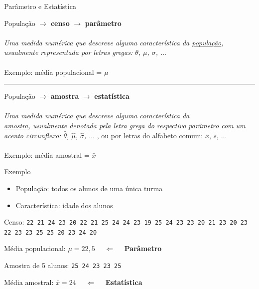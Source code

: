 \documentclass[10pt]{beamer}
\theoremstyle{definition}
\begin{document}
\begin{frame}{Parâmetro e Estatística}
  \begin{center}
    População $\rightarrow$ \textbf{censo} $\rightarrow$
    \textbf{parâmetro} \\~\\
    \textsl{Uma medida numérica que descreve alguma
      característica da \underline{população}, usualmente representada
      por letras gregas: $\theta$, $\mu$, $\sigma$, $\ldots$} \\~\\
    Exemplo: média populacional = $\mu$
  \end{center}
  \vspace{1em}
  \hrule
  \vspace{1em}
  \begin{center}
    População $\rightarrow$ \textbf{amostra} $\rightarrow$
    \textbf{estatística}  \\~\\
    \textsl{Uma medida numérica que descreve alguma
      característica da \\ \underline{amostra}, usualmente denotada pela
    letra grega do respectivo parâmetro com um acento circunflexo:
    $\hat\theta$, $\hat\mu$, $\hat\sigma$, $\ldots$} , ou por letras do
  alfabeto comum: $\bar x$, $s$, $\ldots$\\~\\
    Exemplo: média amostral = $\bar{x}$
  \end{center}
\end{frame}


\begin{frame}{Exemplo}
  \begin{itemize}
  \item População: todos os alunos de uma única turma
  \item Característica: idade dos alunos
    \vspace{1em}
  \end{itemize}
  Censo: \texttt{22 21 24 23 20 22 21 25 24 24 23 19
    25 24 23 23 20 21 23 20 23
    22 23 23 25 25 20 23 24 20}
  \begin{center}
    Média populacional: $\mu = 22,5$ $\quad \Leftarrow \quad$
    \textbf{Parâmetro}
  \end{center}
  Amostra de 5 alunos: \texttt{25 24 23 23 25}
  \begin{center}
    Média amostral: $\bar{x} = 24$ $\quad \Leftarrow \quad$
    \textbf{Estatística}
  \end{center}
\end{frame}
\end{document}
